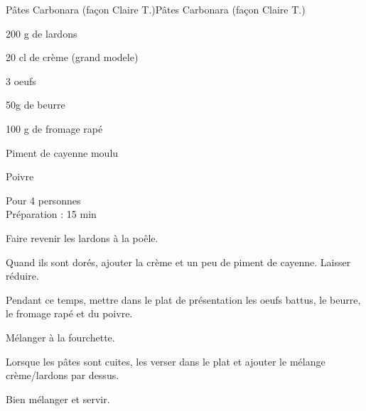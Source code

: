\begin{recette}{Pâtes Carbonara (façon Claire T.)}{Pâtes Carbonara (façon Claire T.)}

\begin{ingredients}
200 g de lardons\par
20 cl  de crème (grand modele)\par
3 oeufs\par
50g de beurre\par
100 g de fromage rapé\par
Piment de cayenne moulu\par
Poivre\par
\end{ingredients}

\begin{infos}
Pour 4 personnes\\
Préparation : 15 min\\
\end{infos}

\begin{etapes}
\item Faire revenir les lardons à la poêle.
\item Quand ils sont dorés, ajouter la crème et un peu de piment de cayenne. Laisser réduire.
\item Pendant ce temps, mettre dans le plat de présentation les oeufs battus, le beurre, le fromage rapé et du poivre.
\item Mélanger à la fourchette.
\item Lorsque les pâtes sont cuites, les verser dans le plat et ajouter le mélange crème/lardons par dessus.
\item Bien mélanger et servir.
\end{etapes}

\end{recette}
